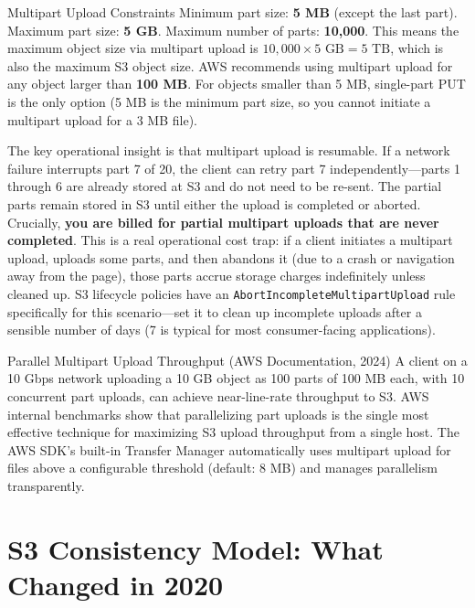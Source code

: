 \documentclass[11pt,a4paper]{article}
\begin{document}
\begin{termbox}{Multipart Upload Constraints}
Minimum part size: \textbf{5 MB} (except the last part). Maximum part size: \textbf{5 GB}. Maximum number of parts: \textbf{10,000}. This means the maximum object size via multipart upload is $10{,}000 \times 5\text{ GB} = 5\text{ TB}$, which is also the maximum S3 object size. AWS recommends using multipart upload for any object larger than \textbf{100 MB}. For objects smaller than 5 MB, single-part PUT is the only option (5 MB is the minimum part size, so you cannot initiate a multipart upload for a 3 MB file).
\end{termbox}

The key operational insight is that multipart upload is resumable. If a network failure interrupts part 7 of 20, the client can retry part 7 independently---parts 1 through 6 are already stored at S3 and do not need to be re-sent. The partial parts remain stored in S3 until either the upload is completed or aborted. Crucially, \textbf{you are billed for partial multipart uploads that are never completed}. This is a real operational cost trap: if a client initiates a multipart upload, uploads some parts, and then abandons it (due to a crash or navigation away from the page), those parts accrue storage charges indefinitely unless cleaned up. S3 lifecycle policies have an \texttt{AbortIncompleteMultipartUpload} rule specifically for this scenario---set it to clean up incomplete uploads after a sensible number of days (7 is typical for most consumer-facing applications).

\begin{industrybox}{Parallel Multipart Upload Throughput (AWS Documentation, 2024)}
A client on a 10 Gbps network uploading a 10 GB object as 100 parts of 100 MB each, with 10 concurrent part uploads, can achieve near-line-rate throughput to S3. AWS internal benchmarks show that parallelizing part uploads is the single most effective technique for maximizing S3 upload throughput from a single host. The AWS SDK's built-in Transfer Manager automatically uses multipart upload for files above a configurable threshold (default: 8 MB) and manages parallelism transparently.
\end{industrybox}

\section{S3 Consistency Model: What Changed in 2020}
\end{document}
